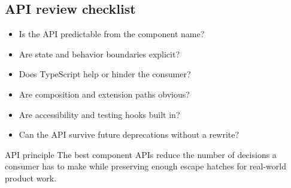 \subsection{API review checklist}
\begin{itemize}[leftmargin=*, itemsep=0.35em]
  \item Is the API predictable from the component name?
  \item Are state and behavior boundaries explicit?
  \item Does TypeScript help or hinder the consumer?
  \item Are composition and extension paths obvious?
  \item Are accessibility and testing hooks built in?
  \item Can the API survive future deprecations without a rewrite?
\end{itemize}

\begin{highlightbox}{API principle}
The best component APIs reduce the number of decisions a consumer has to make while preserving enough escape hatches for real-world product work.
\end{highlightbox}
